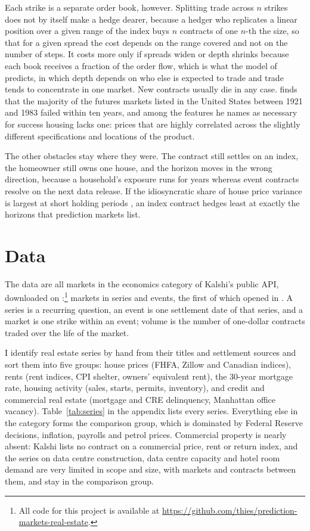 \documentclass[12pt,a4paper]{article}
\begin{document}
Each strike is a separate order book, however. Splitting trade across $n$ strikes does not by itself make a hedge dearer, because a hedger who replicates a linear position over a given range of the index buys $n$ contracts of one $n$-th the size, so that for a given spread the cost depends on the range covered and not on the number of steps. It costs more only if spreads widen or depth shrinks because each book receives a fraction of the order flow, which is what the model of \citet{pagano1989trading} predicts, in which depth depends on who else is expected to trade and trade tends to concentrate in one market. New contracts usually die in any case. \citet{carlton1984futures} finds that the majority of the futures markets listed in the United States between 1921 and 1983 failed within ten years, and among the features he names as necessary for success housing lacks one: prices that are highly correlated across the slightly different specifications and locations of the product.

The other obstacles stay where they were. The contract still settles on an index, the homeowner still owns one house, and the horizon moves in the wrong direction, because a household's exposure runs for years whereas event contracts resolve on the next data release. If the idiosyncratic share of house price variance is largest at short holding periods \citep{giacoletti2021idiosyncratic,eichholtz2021total}, an index contract hedges least at exactly the horizons that prediction markets list.

\section{Data}

The data are all markets in the economics category of Kalshi's public API, downloaded on \dataDate{}:\footnote{All code for this project is available at \url{https://github.com/thies/prediction-markets-real-estate}.} \nMarkets{} markets in \nSeries{} series and \nEvents{} events, the first of which opened in \firstOpen{}. A series is a recurring question, an event is one settlement date of that series, and a market is one strike within an event; volume is the number of one-dollar contracts traded over the life of the market.

I identify real estate series by hand from their titles and settlement sources and sort them into five groups: house prices (FHFA, Zillow and Canadian indices), rents (rent indices, CPI shelter, owners' equivalent rent), the 30-year mortgage rate, housing activity (sales, starts, permits, inventory), and credit and commercial real estate (mortgage and CRE delinquency, Manhattan office vacancy). Table~\ref{tab:series} in the appendix lists every series. Everything else in the category forms the comparison group, which is dominated by Federal Reserve decisions, inflation, payrolls and petrol prices. Commercial property is nearly absent: Kalshi lists no contract on a commercial price, rent or return index, and the \adjSeries{} series on data centre construction, data centre capacity and hotel room demand are very limited in scope and size, with \adjMarkets{} markets and \adjVol{} contracts between them, and stay in the comparison group.
\end{document}
